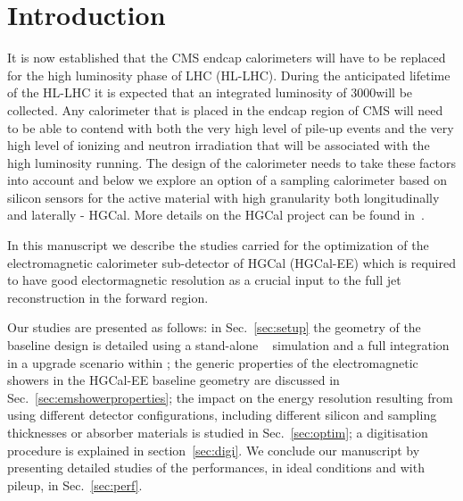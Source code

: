 %
%
%
\clearpage
\section{Introduction}
\label{sec:intro}

It is now established that the CMS endcap calorimeters will have to be replaced for the high
luminosity phase of LHC (HL-LHC). During the anticipated lifetime of
the HL-LHC it is expected
that an integrated luminosity of 3000\fbinv will be collected.
Any calorimeter that is placed in the endcap region of CMS will need to be able to contend with both the very high level of pile-up
events and the very high level of ionizing and neutron irradiation that will be associated with the
high luminosity running. The design of the calorimeter needs to take these factors into account
and below we explore an option of a sampling calorimeter based on silicon sensors for the active
material with high granularity both longitudinally and laterally - HGCal.
More details on the HGCal project can be found in~\cite{HGCal}.

In this manuscript we describe the studies carried for the optimization of
the electromagnetic calorimeter sub-detector of HGCal (HGCal-EE) which is
required to have good electormagnetic resolution as a crucial input to
the full jet reconstruction in the forward region.


Our studies are presented as follows:
in Sec.~\ref{sec:setup} the geometry of the baseline design is
detailed using a stand-alone ~\cite{1610988,Agostinelli:2002hh}
simulation and a full integration in a upgrade scenario within \CMSSW;
the generic properties of the electromagnetic showers in the HGCal-EE baseline geometry
are discussed in Sec.~\ref{sec:emshowerproperties};
the impact on the energy resolution resulting from using different detector
configurations,
including different silicon and sampling thicknesses or absorber
materials is studied in Sec.~\ref{sec:optim};
a digitisation procedure is explained in section~\ref{sec:digi}. 
We conclude our manuscript by presenting detailed
studies of the performances, in ideal conditions and with pileup, in Sec.~\ref{sec:perf}.

